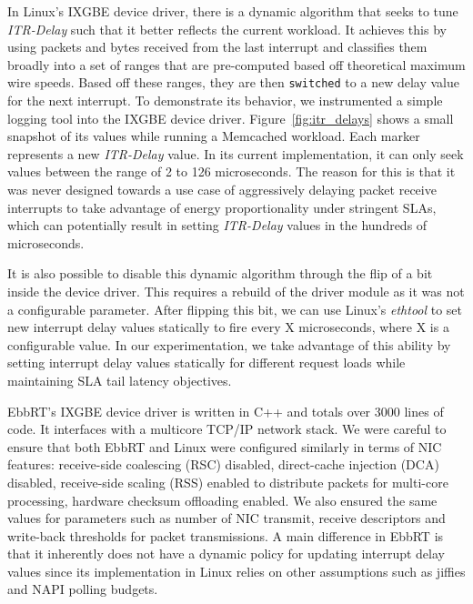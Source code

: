 \documentclass[letterpaper,twocolumn,10pt]{article}
\begin{document}
In Linux's IXGBE device driver, there is a dynamic algorithm that seeks to tune \textit{ITR-Delay} such that it better reflects the current workload.
It achieves this by using packets and bytes received from the last interrupt and classifies them broadly into a set of ranges that are pre-computed based off theoretical maximum wire speeds.
Based off these ranges, they are then \texttt{switched} to a new delay value for the next interrupt.
To demonstrate its behavior, we instrumented a simple logging tool into the IXGBE device driver.
Figure~\ref{fig:itr_delays} shows a small snapshot of its values while running a Memcached workload.
Each marker represents a new \textit{ITR-Delay} value.
In its current implementation, it can only seek values between the range of 2 to 126 microseconds.
The reason for this is that it was never designed towards a use case of aggressively delaying packet receive interrupts to take advantage of energy proportionality under stringent SLAs, which can potentially result in setting \textit{ITR-Delay} values in the hundreds of microseconds.

It is also possible to disable this dynamic algorithm through the flip of a bit inside the device driver.
This requires a rebuild of the driver module as it was not a configurable parameter.
After flipping this bit, we can use Linux's \textit{ethtool} to set new interrupt delay values statically to fire every X microseconds, where X is a configurable value.
In our experimentation, we take advantage of this ability by setting interrupt delay values statically for different request loads while maintaining SLA tail latency objectives.

EbbRT's IXGBE device driver is written in C++ and totals over 3000 lines of code.
It interfaces with a multicore TCP/IP network stack.
We were careful to ensure that both EbbRT and Linux were configured similarly in terms of NIC features: receive-side coalescing (RSC) disabled, direct-cache injection (DCA) disabled, receive-side scaling (RSS) enabled to distribute packets for multi-core processing, hardware checksum offloading enabled.
We also ensured the same values for parameters such as number of NIC transmit, receive descriptors and write-back thresholds for packet transmissions.
A main difference in EbbRT is that it inherently does not have a dynamic policy for updating interrupt delay values since its implementation in Linux relies on other assumptions such as jiffies and NAPI polling budgets.
\end{document}
